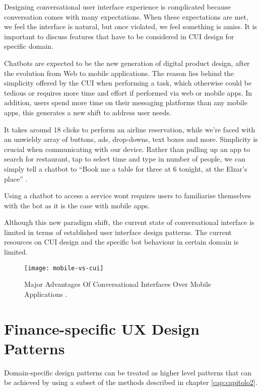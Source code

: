 



Designing conversational user interface experience is complicated because conversation comes with many expectations. When these expectations are met, we feel the interface is natural, but once violated, we feel something is amiss. It is important to discuss features that have to be considered in CUI design for specific domain. 

Chatbots are expected to be the new generation of digital product design, after the evolution from Web to mobile applications. The reason lies behind the simplicity offered by the CUI when performing a task, which otherwise could be tedious or requires more time and effort if performed via web or mobile apps. In addition, users spend more time on their messaging platforms than any mobile apps, this generates a new shift to address user needs.

It takes around 18 clicks to perform an airline reservation, while we’re faced with an unwieldy array of buttons, ads, drop-downs, text boxes and more. Simplicity is crucial when communicating with our device. Rather than pulling up an app to search for restaurant, tap to select time and type in number of people, we can simply tell a chatbot to “Book me a table for three at 6 tonight, at the Elzar’s place” \cite{zakos2008}.

Using a chatbot to access a service wont requires users to familiarise themselves with the bot as it is the case with mobile apps.

Although this new paradigm shift, the current state of conversational interface is limited in terms of established user interface design patterns. The current resources on CUI design and the specific bot behaviour in certain domain is limited.

\begin{figure}[htb]
	\centering
	\texttt{[image: mobile-vs-cui]}
	\caption{Major Advantages Of Conversational Interfaces Over Mobile Applications \cite{fadhil2018}.}
	\label{mobile-vs-cui}
\end{figure}


\section{Finance-specific UX Design Patterns}
Domain-specific design patterns can be treated as higher level patterns that can be achieved by using a subset of the methods described in chapter \ref{cap:capitolo2}. 

